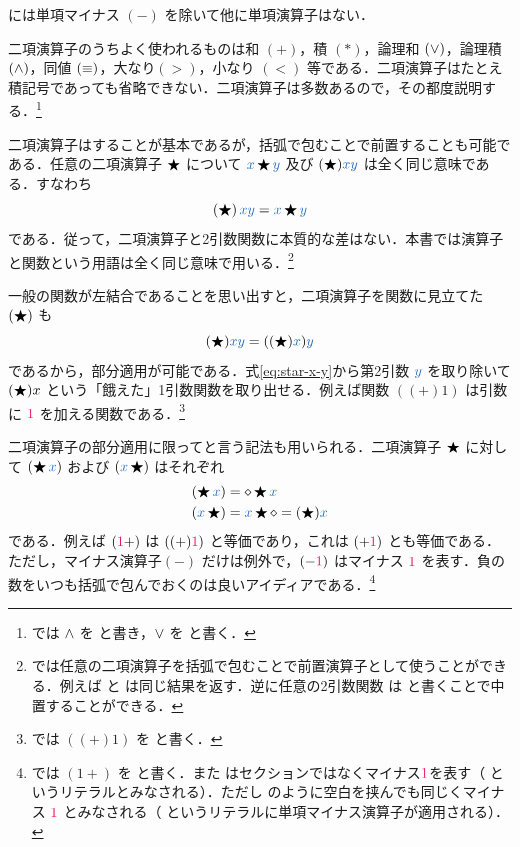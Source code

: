 \documentclass[a5paper,twoside,fleqn,draft]{jsbook}
\begin{document}
\haskell には単項マイナス $(-)$ を除いて他に単項演算子はない．

二項演算子のうちよく使われるものは和 $(+)$，積 $(*)$，論理和 $(\operatorname{\vee})$，論理積 $(\operatorname{\wedge})$，同値 $(\operatorname{\equiv})$，大なり$(>)$，小なり $(<)$ 等である．二項演算子はたとえ積記号であっても省略できない．二項演算子は多数あるので，その都度説明する．\footnote{\haskell では $\operatorname{\wedge}$ を \code{\&\&} と書き，$\operatorname{\vee}$ を \code{||} と書く．}

二項演算子はすることが基本であるが，括弧で包むことで前置することも可能である．任意の二項演算子 $\operatorname{\bigstar}$ について $\hVar{x}\hAnyBinOp\hVar{y}$ 及び $(\hAnyBinOp)\hVar{x}\hVar{y}$ は全く同じ意味である．すなわち
\begin{equation}
  \left(\hAnyBinOp\right)\hVar{x}\hVar{y}
  =\hVar{x}\hAnyBinOp\hVar{y}
\end{equation}
である．従って，二項演算子と2引数関数に本質的な差はない．本書では演算子と関数という用語は全く同じ意味で用いる．\footnote{\haskell では任意の二項演算子を括弧で包むことで前置演算子として使うことができる．例えば と  は同じ結果を返す．逆に任意の2引数関数 は  と書くことで中置することができる．}

一般の関数が左結合であることを思い出すと，二項演算子を関数に見立てた
$(\operatorname{\bigstar})$ も
\begin{equation}
  \label{eq:star-x-y}
  (\hAnyBinOp)\hVar{x}\hVar{y}
  =((\hAnyBinOp)\hVar{x})\hVar{y}
\end{equation}
であるから，部分適用が可能である．式\eqref{eq:star-x-y}から第2引数 $\hVar{y}$ を取り除いて $(\operatorname{\bigstar})x$ という「餓えた」1引数関数を取り出せる．例えば関数 $((+)1)$ は引数に $\hConstant{1}$ を加える関数である．\footnote{\haskell では $((+)1)$ を  と書く．}

\separator

二項演算子の部分適用に限ってと言う記法も用いられる．二項演算子 $\operatorname{\bigstar}$ に対して $(\hAnyBinOp\hVar{x})$ および $(\hVar{x}\hAnyBinOp)$ はそれぞれ
\begin{align}
  (\hAnyBinOp\hVar{x})
  &=\hAnonParam\hAnyBinOp\hVar{x}\\
  (\hVar{x}\hAnyBinOp)
  &=\hVar{x}\hAnyBinOp\hAnonParam=(\hAnyBinOp)\hVar{x}
\end{align}
である．例えば $(\hConstant{1}+)$ は $((+)\hConstant{1})$ と等価であり，これは $(+\hConstant{1})$ とも等価である．ただし，マイナス演算子$(-)$ だけは例外で，$(-\hConstant{1})$ はマイナス $\hConstant{1}$ を表す．負の数をいつも括弧で包んでおくのは良いアイディアである．\footnote{\haskell では $(1+)$ を と書く．また  はセクションではなくマイナス$\hConstant{1}$を表す（ というリテラルとみなされる）．ただし のように空白を挟んでも同じくマイナス $\hConstant{1}$ とみなされる（ というリテラルに単項マイナス演算子が適用される）．}
\end{document}
